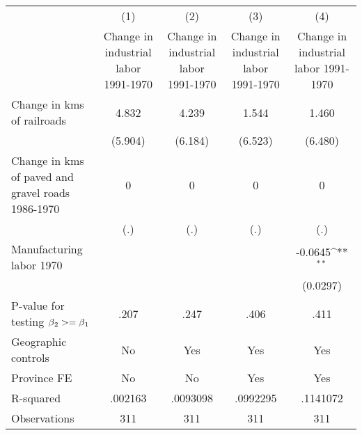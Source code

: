 {
\def\sym#1{\ifmmode^{#1}\else\(^{#1}\)\fi}
\begin{tabular}{l*{4}{c}}
\hline\hline
                &\multicolumn{1}{c}{(1)}&\multicolumn{1}{c}{(2)}&\multicolumn{1}{c}{(3)}&\multicolumn{1}{c}{(4)}\\
                &\multicolumn{1}{c}{Change in industrial labor 1991-1970}&\multicolumn{1}{c}{Change in industrial labor 1991-1970}&\multicolumn{1}{c}{Change in industrial labor 1991-1970}&\multicolumn{1}{c}{Change in industrial labor 1991-1970}\\
\hline
Change in kms of railroads&    4.832         &    4.239         &    1.544         &    1.460         \\
                &  (5.904)         &  (6.184)         &  (6.523)         &  (6.480)         \\
[1em]
Change in kms of paved and gravel roads 1986-1970&        0         &        0         &        0         &        0         \\
                &      (.)         &      (.)         &      (.)         &      (.)         \\
[1em]
Manufacturing labor 1970&                  &                  &                  &  -0.0645\sym{**} \\
                &                  &                  &                  & (0.0297)         \\
\hline
P-value for testing $\beta\\_2 >= \beta\\_1$&     .207         &     .247         &     .406         &     .411         \\
Geographic controls&       No         &      Yes         &      Yes         &      Yes         \\
Province FE     &       No         &       No         &      Yes         &      Yes         \\
R-squared       &  .002163         & .0093098         & .0992295         & .1141072         \\
Observations    &      311         &      311         &      311         &      311         \\
\hline\hline
\end{tabular}
}
